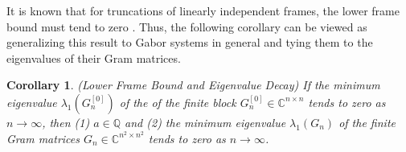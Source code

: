 \documentclass{article}
\newtheorem{corollary}{Corollary}[theorem]
\newtheorem{lemma}[theorem]{Lemma}
\begin{document}
It is known that for truncations of linearly independent frames, the lower frame bound must tend to zero \cite{adcock2019frames}. Thus, the following corollary can be viewed as generalizing this result to Gabor systems in general and tying them to the eigenvalues of their Gram matrices.




\begin{corollary} (Lower Frame Bound and Eigenvalue Decay) \label{cor: min_eig_finite_gabor}
    If the minimum eigenvalue $\lambda_1(G_n^{[0]})$ of the of the finite block $G_n^{[0]}\in \mathbb{C}^{n\times n}$ tends to zero as $n \rightarrow\infty$, then (1) $a \in \mathbb{Q}$ and (2) the minimum eigenvalue $\lambda_1(G_n)$ of the finite Gram matrices ${G}_n\in \mathbb{C}^{n^2\times n^2}$ tends to zero as $n \rightarrow \infty$.
\end{corollary}






\end{document}
